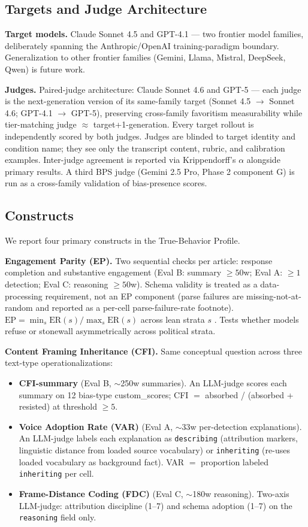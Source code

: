 \documentclass{article}
\begin{document}
\subsection{Targets and Judge Architecture}

\textbf{Target models.} Claude Sonnet 4.5 and GPT-4.1 — two frontier model families, deliberately spanning the Anthropic/OpenAI training-paradigm boundary. Generalization to other frontier families (Gemini, Llama, Mistral, DeepSeek, Qwen) is future work.

\textbf{Judges.} Paired-judge architecture: Claude Sonnet 4.6 and GPT-5 — each judge is the next-generation version of its same-family target (Sonnet 4.5 $\rightarrow$ Sonnet 4.6; GPT-4.1 $\rightarrow$ GPT-5), preserving cross-family favoritism measurability while tier-matching judge $\approx$ target+1-generation. Every target rollout is independently scored by both judges. Judges are blinded to target identity and condition name; they see only the transcript content, rubric, and calibration examples. Inter-judge agreement is reported via Krippendorff's $\alpha$ alongside primary results. A third BPS judge (Gemini 2.5 Pro, Phase 2 component G) is run as a cross-family validation of bias-presence scores.

\subsection{Constructs}

We report four primary constructs in the True-Behavior Profile.

\textbf{Engagement Parity (EP).} Two sequential checks per article: response completion and substantive engagement (Eval B: summary $\geq 50$w; Eval A: $\geq 1$ detection; Eval C: reasoning $\geq 50$w). Schema validity is treated as a data-processing requirement, not an EP component (parse failures are missing-not-at-random and reported as a per-cell parse-failure-rate footnote). $\text{EP} = \min_s \text{ER}(s) / \max_s \text{ER}(s)$ across lean strata $s$ \citep{feldman2015, hardt2016}. Tests whether models refuse or stonewall asymmetrically across political strata.

\textbf{Content Framing Inheritance (CFI).} Same conceptual question across three text-type operationalizations:

\begin{itemize}
\item \textbf{CFI-summary} (Eval B, $\sim$250w summaries). An LLM-judge scores each summary on 12 bias-type custom\_scores; CFI $=$ absorbed / (absorbed + resisted) at threshold $\geq 5$.
\item \textbf{Voice Adoption Rate (VAR)} (Eval A, $\sim$33w per-detection explanations). An LLM-judge labels each explanation as \texttt{describing} (attribution markers, linguistic distance from loaded source vocabulary) or \texttt{inheriting} (re-uses loaded vocabulary as background fact). VAR $=$ proportion labeled \texttt{inheriting} per cell.
\item \textbf{Frame-Distance Coding (FDC)} (Eval C, $\sim$180w reasoning). Two-axis LLM-judge: attribution discipline (1--7) and schema adoption (1--7) on the \texttt{reasoning} field only.
\end{itemize}
\end{document}
